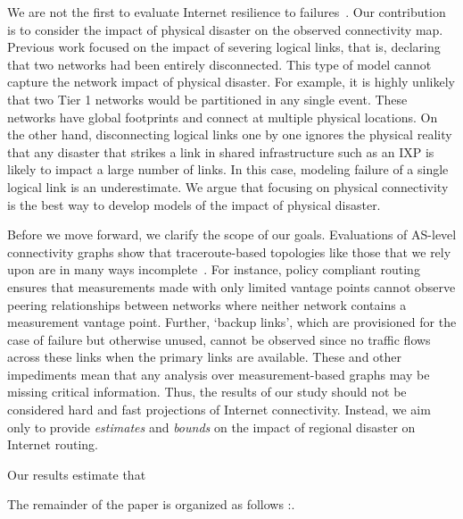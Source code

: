 We are not the first to evaluate Internet resilience to
failures~\cite{michigan, measuringresilience, resilience-under-BGP,
resilience-complex-networks}.  Our contribution is to consider the impact of
physical disaster on the observed connectivity map.  Previous work focused on
the impact of severing logical links, that is, declaring that two networks had
been entirely disconnected.  This type of model cannot capture the network
impact of physical disaster.  For example, it is highly unlikely that two Tier
1 networks would be partitioned in any single event.  These networks have
global footprints and connect at multiple physical locations.  On the other
hand, disconnecting logical links one by one ignores the physical reality that
any disaster that strikes a link in shared infrastructure such as an IXP is
likely to impact a large number of links.  In this case, modeling failure of a
single logical link is an underestimate.  We argue that focusing on physical
connectivity is the best way to develop models of the impact of physical
disaster. 


Before we move forward, we clarify the scope of our goals.  Evaluations of
AS-level connectivity graphs show that traceroute-based topologies like those
that we rely upon are in many ways incomplete~\cite{walter}.  For instance,
policy compliant routing ensures that measurements made with only limited
vantage points cannot observe peering relationships between networks where
neither network contains a measurement vantage point.  Further, `backup links',
which are provisioned for the case of failure but otherwise unused, cannot be
observed since no traffic flows across these links when the primary links are
available.  These and other impediments mean that any analysis over
measurement-based graphs may be missing critical information.  Thus, the
results of our study should not be considered hard and fast projections of
Internet connectivity.  Instead, we aim only to provide {\it estimates} and
{\it bounds} on the impact of regional disaster on Internet routing.

Our results estimate that \justine{\ldots}

The remainder of the paper is organized as follows \justine{\ldots}:.

